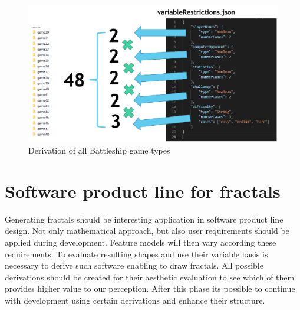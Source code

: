 \documentclass[11pt,english,a4paper,twoside]{article}
\begin{document}
\begin{figure}[!t]  %
					\begin{center}
									\includegraphics[width=\linewidth]{fig/allCases.png}
									\caption{Derivation of all Battleship game types}
									\label{derivationBattleshipTypes}
					\end{center}
\end{figure}


\section{Software product line for fractals} \label{fractalProductLine}

Generating fractals should be interesting application in software product line design. Not only mathematical approach, but also user requirements should be applied during development. Feature models will then vary according these requirements. To evaluate resulting shapes and use their variable basis is necessary to derive such software enabling to draw fractals. All possible derivations should be created for their aesthetic evaluation to see which of them provides higher value to our perception. After this phase its possible to continue with development using certain derivations and enhance their structure.
\end{document}
